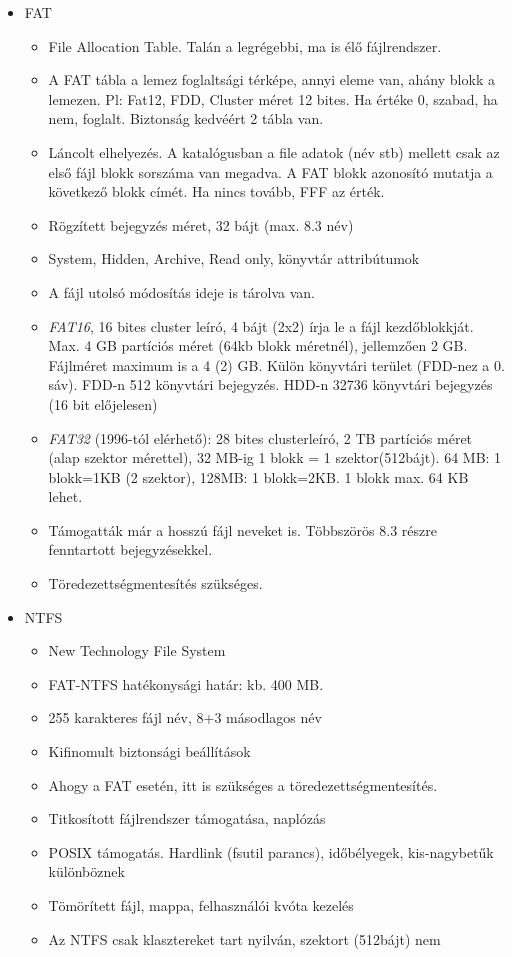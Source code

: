 \documentclass[margin=0px]{article}
\begin{document}
	\begin{itemize}
		\item FAT
		\begin{itemize}
			\item File Allocation Table. Talán a legrégebbi, ma is élő fájlrendszer.
			\item A FAT tábla a lemez foglaltsági térképe, annyi eleme van, ahány blokk a lemezen. Pl: Fat12, FDD, Cluster méret 12 bites. Ha értéke 0, szabad, ha nem, foglalt. Biztonság kedvéért 2 tábla van.
			\item Láncolt elhelyezés. A katalógusban a file adatok (név stb) mellett csak az első fájl blokk sorszáma van megadva. A FAT blokk azonosító mutatja a következő blokk címét. Ha nincs tovább, FFF az érték.
			\item Rögzített bejegyzés méret, 32 bájt (max. 8.3 név)
			\item System, Hidden, Archive, Read only, könyvtár attribútumok
			\item A fájl utolsó módosítás ideje is tárolva van.
			\item \textit{FAT16}, 16 bites cluster leíró, 4 bájt (2x2) írja le a fájl kezdőblokkját. Max. 4 GB partíciós méret (64kb blokk méretnél), jellemzően 2 GB. Fájlméret maximum is a 4 (2) GB. Külön könyvtári terület (FDD-nez a 0. sáv). FDD-n 512 könyvtári bejegyzés. HDD-n 32736 könyvtári bejegyzés (16 bit előjelesen)
			\item \textit{FAT32} (1996-tól elérhető): 28 bites clusterleíró, 2 TB partíciós méret (alap szektor mérettel), 32 MB-ig 1 blokk = 1 szektor(512bájt). 64 MB: 1 blokk=1KB (2 szektor), 128MB: 1 blokk=2KB. 1 blokk max. 64 KB lehet.
			\item Támogatták már a hosszú fájl neveket is. Többszörös 8.3 részre fenntartott bejegyzésekkel.
			\item Töredezettségmentesítés szükséges.
		\end{itemize}
		\item NTFS
		\begin{itemize}
			\item New Technology File System
			\item FAT-NTFS hatékonysági határ: kb. 400 MB.
			\item 255 karakteres fájl név, 8+3 másodlagos név
			\item Kifinomult biztonsági beállítások
			\item Ahogy a FAT esetén, itt is szükséges a töredezettségmentesítés.
			\item Titkosított fájlrendszer támogatása, naplózás
			\item POSIX támogatás. Hardlink (fsutil parancs), időbélyegek, kis-nagybetűk különböznek
			\item Tömörített fájl, mappa, felhasználói kvóta kezelés
			\item Az NTFS csak klasztereket tart nyilván, szektort (512bájt) nem
	

\end{itemize}
\end{itemize}
\end{document}
